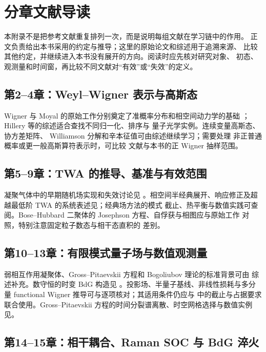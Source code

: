 \chapter{分章文献导读}
\label{app:further-reading}

本附录不是把参考文献重复排列一次，而是说明每组文献在学习链中的作用。
正文负责给出本书采用的约定与推导；这里的原始论文和综述用于追溯来源、
比较其他约定，并继续进入本书没有展开的方向。阅读时应先核对研究对象、
初态、观测量和时间窗，再比较不同文献对“有效”或“失效”的定义。

\section{第2--4章：Weyl--Wigner 表示与高斯态}

Wigner 与 Moyal 的原始工作分别奠定了准概率分布和相空间动力学的基础
\cite{Wigner1932,Moyal1949}；Hillery 等的综述适合查找不同归一化、排序与
量子光学实例\cite{Hillery1984}。连续变量高斯态、协方差矩阵、
Williamson 分解和辛本征值可由综述\cite{Weedbrook2012}继续学习；需要处理
非正普通概率或更一般高斯算符表示时，可比较
文献\cite{Corney2003}与本书的正 Wigner 抽样范围。

\section{第5--9章：TWA 的推导、基准与有效范围}

凝聚气体中的早期随机场实现和失效讨论见
\cite{Steel1998,Sinatra2002}。相空间半经典展开、响应修正及超越最低阶 TWA
的系统表述见\cite{Polkovnikov2003,Polkovnikov2010}；经典场方法的模式
截止、热平衡与数值实践可查阅\cite{Blakie2008}。Bose--Hubbard 二聚体的
Josephson 方程、自俘获与相图应与原始工作
\cite{Smerzi1997,Raghavan1999}对照，特别注意固定粒子数态与相干态直积的
差别。

\section{第10--13章：有限模式量子场与数值观测量}

弱相互作用凝聚体、Gross--Pitaevskii 方程和 Bogoliubov 理论的标准背景可由
综述\cite{Dalfovo1999}补充。数守恒的时变 BdG 构造见
\cite{Castin1998}。投影场、半量子基线、非线性损耗与多分量 functional
Wigner 推导可与\cite{Opanchuk2013}逐项核对；其适用条件仍应与
\cite{Sinatra2002,Blakie2008}中的截止与占据要求联合使用。Gross--Pitaevskii
方程的时间分裂谱离散、时空网格选择与数值实例见\cite{Bao2003}。

\section{第14--15章：相干耦合、Raman SOC 与 BdG 淬火}

